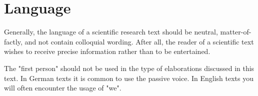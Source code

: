 \section{Language}

Generally, the language of a scientific research text should be neutral, matter-of-factly,
and not contain colloquial wording. After all, the reader of a scientific text wishes to
receive precise information rather than to be entertained.

\begin{quotation}
\end{quotation}

The "first person" should not be used in the type of elaborations discussed in
this text. In German texts it is common to use the passive voice. In English texts you will
often encounter the usage of "we".

\begin{quotation}
\end{quotation}

